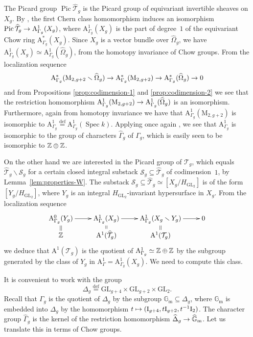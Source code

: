 \documentclass{amsart}
\numberwithin{equation}{section}
\numberwithin{subsection}{section}
\theoremstyle{definition}
\theoremstyle{remark}
\newcommand\cS{\mathcal{S}} \newcommand\cT{\mathcal{T}}
\newcommand\GG{\mathbb{G}} \newcommand\HH{\mathbb{H}}
\newcommand\rA{\mathrm{A}} \newcommand\rB{\mathrm{B}}
\newcommand\rI{\mathrm{I}} \newcommand\rJ{\mathrm{J}}
\newcommand\rM{\mathrm{M}} \newcommand\rN{\mathrm{N}}
\newcommand\arr{\ifinner\to\else\longrightarrow\fi}
\newcommand\arrto{\ifinner\mapsto\else\longmapsto\fi}
\newcommand\eqdef{\overset{\mathrm{\scriptscriptstyle def}} =}
\newcommand\pic{\operatorname{Pic}}
\newcommand\spec{\operatorname{Spec}}
\renewcommand{\setminus}{\smallsetminus}
\newcommand{\T}[1][g]{\cT_{#1}}
\newcommand{\OT}[1][g]{\widehat{\cT}_{#1}}
\newcommand{\GL}{\mathrm{GL}}
\newcommand{\gm}{\mathbb{G}_{\mathrm{m}}}
\newcommand\Hg{H_{\GL_2}}
\begin{document}
The Picard group $\pic\OT$ is the Picard group of equivariant invertible sheaves on $X_{g}$. By \cite[Proposition~18]{edieit}, the first Chern class homomorphism induces an isomorphism $\pic\OT \arr \rA^{1}_{\Gamma_{g}}(X_{g})$, where $\rA^{1}_{\Gamma_{g}}(X_{g})$ is the part of degree~$1$ of the equivariant Chow ring $\rA^{*}_{\Gamma_{g}}(X_{g})$. Since $X_{g}$ is a vector bundle over $\widehat{\Omega}_{g}$, we have $\rA^{1}_{\Gamma_{g}}(X_{g}) \simeq \rA^{1}_{\Gamma_{g}}(\widehat{\Omega}_{g})$, from the homotopy invariance of Chow groups. From the localization sequence
   \[
   \rA^{*}_{\Gamma_{g}}(\rM_{2, g+2} \setminus \widehat{\Omega}_{g})
   \arr \rA^{*}_{\Gamma_{g}}(\rM_{2, g+2})
   \arr \rA^{*}_{\Gamma_{g}}(\widehat{\Omega}_{g})
   \arr 0
   \]
and from Propositions \ref{prop:codimension-1} and \ref{prop:codimension-2} we see that the restriction homomorphism $\rA^{1}_{\Gamma_{g}}(\rM_{2, g+2}) \arr \rA^{1}_{\Gamma_{g}}(\widehat{\Omega}_{g})$ is an isomorphism. Furthermore, again from homotopy invariance we have that $\rA^{1}_{\Gamma_{g}}(\rM_{2, g+2})$ is isomorphic to $\rA^{1}_{\Gamma_{g}} \eqdef \rA^{1}_{\Gamma_{g}}(\spec k)$. Applying once again \cite[Proposition~18]{edieit}, we see that $\rA^{1}_{\Gamma_{g}}$ is isomorphic to the group of characters $\widehat{\Gamma}_{g}$ of $\Gamma_{g}$, which is easily seen to be isomorphic to $\mathbb{Z} \oplus \mathbb{Z}$. 

On the other hand we are interested in the Picard group of $\T$, which equals $\OT \setminus \cS_{g}$ for a certain closed integral substack $\cS_{g} \subseteq \OT$ of codimension~$1$, by Lemma~\ref{lem:properties-W}. The substack $\cS_{g} \subseteq \OT \simeq [X_{g}/\Hg]$ is of the form $[Y_{g}/\Hg]$, where $Y_{g}$ is an integral $\Hg$-invariant hypersurface in $X_{g}$. From the localization sequence
   \[
   \xymatrix@R6pt{
   \rA^{0}_{\Gamma_{g}}(Y_{g}) \ar[r]\ar@{ = }[d]&
   \rA^{1}_{\Gamma_{g}}(X_{g}) \ar[r]\ar@{ = }[d]&
   \rA^{1}_{\Gamma_{g}}(X_{g}\setminus Y_{g}) \ar[r]\ar@{ = }[d]&
   0\\
   \ZZ & \rA^{1}(\OT)&\rA^{1}(\T)
   }
   \]
we deduce that $\rA^{1}(\T)$ is the quotient of $\rA^{1}_{\Gamma_{g}} \simeq \ZZ \oplus \ZZ$ by the subgroup generated by the class of $Y_{g}$ in $\rA^{1}_{\Gamma} = \rA^{1}_{\Gamma_{g}}(X_{g})$. We need to compute this class.

It is convenient to work with the group
   \[
   \Delta_{g} \eqdef \GL_{g+4}\times \GL_{g+2} \times \GL_{2}.
   \]
Recall that $\Gamma_{g}$ is the quotient of $\Delta_{g}$ by the subgroup $\gm \subseteq \Delta_{g}$, where $\gm$ is embedded into $\Delta_{g}$ by the homomorphism $t \arrto (\rI_{g+4}, t\rI_{g+2}, t^{-1}\rI_{2})$. The character group $\widehat{\Gamma}_{g}$ is the kernel of the restriction homomorphism $\widehat{\Delta}_{g} \arr \widehat{\GG}_{\mathrm{m}}$. Let us translate this in terms of Chow groups.
\end{document}
